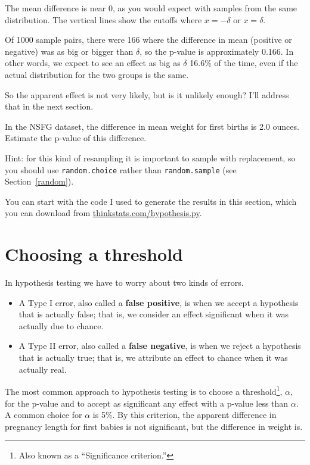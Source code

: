 \documentclass[12pt]{book}
\begin{document}
The mean difference is near 0, as you would expect with samples
from the same distribution.  The vertical lines show the cutoffs where
$x=-\delta$ or $x=\delta$.

Of 1000 sample pairs, there were 166 where the difference in mean
(positive or negative) was as big or bigger than $\delta$, so the
p-value is approximately 0.166.  In other words, we expect to see an
effect as big as $\delta$ 16.6\% of the time, even if the actual
distribution for the two groups is the same.

So the apparent effect is not very likely, but is it unlikely enough?
I'll address that in the next section.

\begin{ex}

In the NSFG dataset, the difference in mean weight for first
births is 2.0 ounces.  Estimate the p-value of this difference.

Hint: for this kind of resampling it is important to sample
with replacement, so you should use {\tt random.choice} rather
than {\tt random.sample} (see Section~\ref{random}).

You can start with the code I used to generate the results in this
section, which you can download from \url{thinkstats.com/hypothesis.py}.

\end{ex}


\section{Choosing a threshold}
\label{threshold}

In hypothesis testing we have to worry about two kinds of errors.

\begin{itemize}

\item A Type I error, also called a {\bf false positive}, is when we
  accept a hypothesis that is actually false; that is, we consider an
  effect significant when it was actually due to chance.

\item A Type II error, also called a {\bf false negative}, is when we
  reject a hypothesis that is actually true; that is, we attribute an
  effect to chance when it was actually real.

\end{itemize}

The most common approach to hypothesis testing is to choose a
threshold\footnote{Also known as a ``Significance criterion.''},
$\alpha$, for the p-value and to accept as significant any effect with
a p-value less than $\alpha$.  A common choice for $\alpha$ is 5\%.
By this criterion, the apparent difference in pregnancy length for
first babies is not significant, but the difference in weight is.
\end{document}
